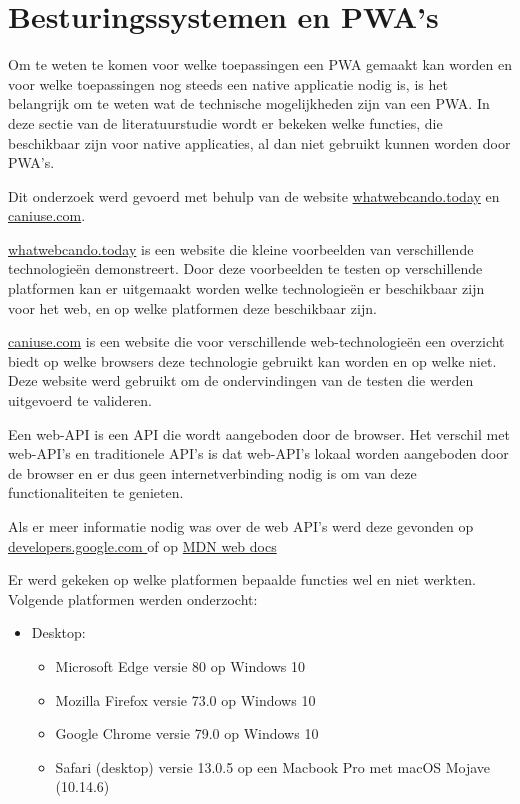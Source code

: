 \clearpage
\section{Besturingssystemen en PWA's}
\label{ch: BesturingssystemenEnPWAs}

Om te weten te komen voor welke toepassingen een PWA gemaakt kan worden en voor welke toepassingen nog steeds een native applicatie nodig is, is het belangrijk om te weten wat de technische mogelijkheden zijn van een PWA. In deze sectie van de literatuurstudie wordt er bekeken welke functies, die beschikbaar zijn voor native applicaties, al dan niet gebruikt kunnen worden door PWA's.

Dit onderzoek werd gevoerd met behulp van de website \href{https://whatwebcando.today/}{whatwebcando.today} en
\href{https://caniuse.com/}{caniuse.com}.

                                 
\href{https://whatwebcando.today/}{whatwebcando.today} is een website die kleine voorbeelden van verschillende technologieën demonstreert. Door deze voorbeelden te testen op verschillende platformen kan er uitgemaakt worden welke technologieën er beschikbaar zijn voor het web, en op welke platformen deze beschikbaar zijn.

\href{https://caniuse.com/}{ caniuse.com} is een website die voor verschillende web-technologieën een overzicht biedt op welke browsers deze technologie gebruikt kan worden en op welke niet. Deze website werd gebruikt om de ondervindingen van de testen die werden uitgevoerd te valideren. 

Een web-API is een API die wordt aangeboden door de browser. Het verschil met web-API's en traditionele API's is dat web-API's lokaal worden aangeboden door de browser en er dus geen internetverbinding nodig is om van deze functionaliteiten te genieten.
\autocite{Mozilla2019c}


Als er meer informatie nodig was over de web API's werd deze gevonden op \href{https://developers.google.com/}{developers.google.com } of op \href{https://developer.mozilla.org/nl/}{MDN web docs}

Er werd gekeken op welke platformen bepaalde functies wel en niet werkten. Volgende platformen werden onderzocht:
\begin{itemize}
   \item Desktop:
   \begin{itemize}
     \item	Microsoft Edge versie 80 op Windows 10
     \item	Mozilla Firefox versie 73.0 op Windows 10
     \item	Google Chrome versie 79.0 op Windows 10
     \item  Safari (desktop) versie 13.0.5 op een Macbook Pro met macOS Mojave (10.14.6)
   \end{itemize}
\end{itemize}


